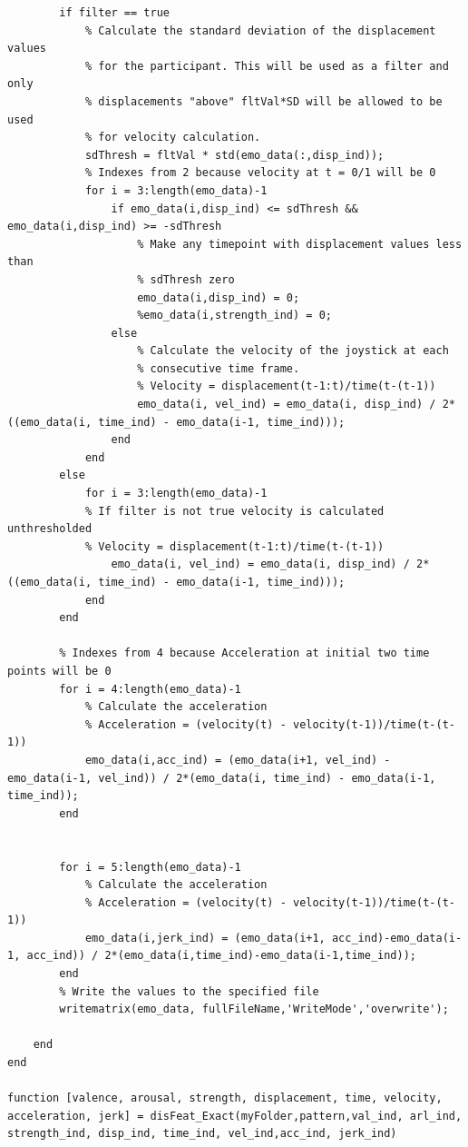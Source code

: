 \begin{lstlisting}
        if filter == true
            % Calculate the standard deviation of the displacement values
            % for the participant. This will be used as a filter and only
            % displacements "above" fltVal*SD will be allowed to be used
            % for velocity calculation.
            sdThresh = fltVal * std(emo_data(:,disp_ind));
            % Indexes from 2 because velocity at t = 0/1 will be 0
            for i = 3:length(emo_data)-1
                if emo_data(i,disp_ind) <= sdThresh && emo_data(i,disp_ind) >= -sdThresh
                    % Make any timepoint with displacement values less than
                    % sdThresh zero
                    emo_data(i,disp_ind) = 0;
                    %emo_data(i,strength_ind) = 0;
                else
                    % Calculate the velocity of the joystick at each
                    % consecutive time frame.
                    % Velocity = displacement(t-1:t)/time(t-(t-1))
                    emo_data(i, vel_ind) = emo_data(i, disp_ind) / 2*((emo_data(i, time_ind) - emo_data(i-1, time_ind)));
                end
            end
        else
            for i = 3:length(emo_data)-1
            % If filter is not true velocity is calculated unthresholded
            % Velocity = displacement(t-1:t)/time(t-(t-1))
                emo_data(i, vel_ind) = emo_data(i, disp_ind) / 2*((emo_data(i, time_ind) - emo_data(i-1, time_ind)));
            end
        end
        
        % Indexes from 4 because Acceleration at initial two time points will be 0
        for i = 4:length(emo_data)-1
            % Calculate the acceleration 
            % Acceleration = (velocity(t) - velocity(t-1))/time(t-(t-1))
            emo_data(i,acc_ind) = (emo_data(i+1, vel_ind) - emo_data(i-1, vel_ind)) / 2*(emo_data(i, time_ind) - emo_data(i-1, time_ind));
        end
        

        for i = 5:length(emo_data)-1
            % Calculate the acceleration 
            % Acceleration = (velocity(t) - velocity(t-1))/time(t-(t-1))
            emo_data(i,jerk_ind) = (emo_data(i+1, acc_ind)-emo_data(i-1, acc_ind)) / 2*(emo_data(i,time_ind)-emo_data(i-1,time_ind));
        end
        % Write the values to the specified file
        writematrix(emo_data, fullFileName,'WriteMode','overwrite');
    
    end
end

function [valence, arousal, strength, displacement, time, velocity, acceleration, jerk] = disFeat_Exact(myFolder,pattern,val_ind, arl_ind, strength_ind, disp_ind, time_ind, vel_ind,acc_ind, jerk_ind)  


\end{lstlisting}

